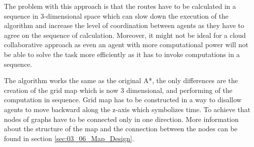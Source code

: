 The problem with this approach is that the routes have to be calculated in a sequence in 3-dimensional space which can slow down the execution of the algorithm and increase the level of coordination between agents as they have to agree on the sequence of calculation. Moreover, it might not be ideal for a cloud collaborative approach as even an agent with more computational power will not be able to solve the task more efficiently as it has to invoke computations in a sequence.

The algorithm works the same as the original A*, the only differences are the creation of the grid map which is now 3 dimensional, and  performing of the computation in sequence. Grid map has to be constructed in a way to disallow agents to move backward along the z-axis which symbolizes time. To achieve that nodes of graphs have to be connected only in one direction. More information about the structure of the map and the connection between the nodes can be found in section \ref{sec:03_06_Map_Design}.